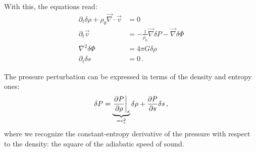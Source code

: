 \documentclass[main.tex]{subfiles}
\begin{document}
With this, the equations read:
%
\begin{align}
  \partial_{t} \delta \rho  +
  \rho_0 \vec{\nabla} \cdot \vec{v} &= 0 \\
  \partial_{t} \vec{v} &= - \frac{1}{\rho_0 } \vec{\nabla} \delta P - \vec{\nabla} \delta \Phi \\
  \nabla^2 \delta \Phi &= 4 \pi G \delta \rho  \\
  \partial_{t} \delta s &= 0
\,.
\end{align}

The pressure perturbation can be expressed in terms of the density and entropy ones:
%
\begin{align}
  \delta P = \underbrace{\eval{\pdv{P}{\rho }}_{s}}_{= c_s^2} \delta \rho + \pdv{P}{s} \delta s
\,,
\end{align}
%
where we recognize the constant-entropy derivative of the pressure with respect to the density: the square of the adiabatic speed of sound.



\end{document}
